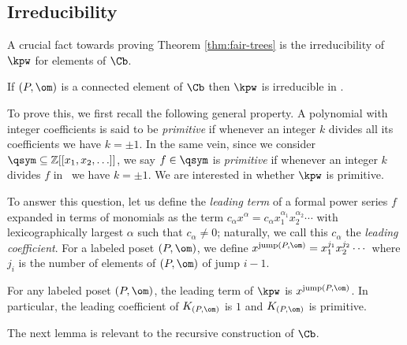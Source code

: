 \subsection{Irreducibility}

A crucial fact towards proving Theorem \ref{thm:fair-trees} is the irreducibility 
of $\kpw$ for elements of $\Cb$. 

\begin{proposition}\label{prop:irred-C}
If $(P,\om)$ is a connected element of $\Cb$ then $\kpw$ is irreducible in \qsym.
\end{proposition}

To prove this, we first recall the following general property.  A polynomial with integer coefficients is said to be \emph{primitive} if 
whenever an integer $k$ divides all its coefficients we have $k=\pm1$.
In the same vein, since we consider $\qsym \subseteq \mathbb{Z}[[x_1, x_2, \ldots]]$, we say $f \in \qsym$ is \emph{primitive} if whenever an integer $k$ divides $f$ in \qsym\ we have $k = \pm1$.
We are interested in whether $\kpw$ is primitive.  

To answer this question, let us define the \emph{leading term} of a formal power series $f$ expanded in terms of monomials as the term $c_\alpha x^\alpha = c_\alpha x_1^{\alpha_1} x_2^{\alpha_2} \cdots$ with lexicographically largest $\alpha$ such that $c_\alpha \neq 0$; naturally, we call this $c_\alpha$ the \emph{leading coefficient}.  For a labeled poset $(P,\om)$, we define $x^{\mathrm{jump}(P,\om)} = x_1^{j_1} x_2^{j_2} \cdots$ where $j_i$ is the number of elements of $(P,\om)$ of jump $i-1$.

\begin{proposition}\label{prop:prim}
For any labeled poset $(P,\om)$, the leading term of $\kpw$ is $x^{\mathrm{jump}(P,\om)}$.  In particular, the leading coefficient of $K_{(P, \om)}$ is $1$ and $K_{(P, \om)}$ is primitive.
\end{proposition}

The next lemma is relevant to the recursive construction of $\Cb$.

